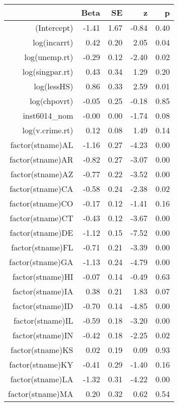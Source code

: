 \begin{table}[ht]
\centering
\begin{tabular}{rrrrr}
  \hline
 & Beta & SE & z & p \\ 
  \hline
(Intercept) & -1.41 & 1.67 & -0.84 & 0.40 \\ 
  log(incarrt) & 0.42 & 0.20 & 2.05 & 0.04 \\ 
  log(unemp.rt) & -0.29 & 0.12 & -2.40 & 0.02 \\ 
  log(singpar.rt) & 0.43 & 0.34 & 1.29 & 0.20 \\ 
  log(lessHS) & 0.86 & 0.33 & 2.59 & 0.01 \\ 
  log(chpovrt) & -0.05 & 0.25 & -0.18 & 0.85 \\ 
  inst6014\_nom & -0.00 & 0.00 & -1.74 & 0.08 \\ 
  log(v.crime.rt) & 0.12 & 0.08 & 1.49 & 0.14 \\ 
  factor(stname)AL & -1.16 & 0.27 & -4.23 & 0.00 \\ 
  factor(stname)AR & -0.82 & 0.27 & -3.07 & 0.00 \\ 
  factor(stname)AZ & -0.77 & 0.22 & -3.52 & 0.00 \\ 
  factor(stname)CA & -0.58 & 0.24 & -2.38 & 0.02 \\ 
  factor(stname)CO & -0.17 & 0.12 & -1.41 & 0.16 \\ 
  factor(stname)CT & -0.43 & 0.12 & -3.67 & 0.00 \\ 
  factor(stname)DE & -1.12 & 0.15 & -7.52 & 0.00 \\ 
  factor(stname)FL & -0.71 & 0.21 & -3.39 & 0.00 \\ 
  factor(stname)GA & -1.13 & 0.24 & -4.79 & 0.00 \\ 
  factor(stname)HI & -0.07 & 0.14 & -0.49 & 0.63 \\ 
  factor(stname)IA & 0.38 & 0.21 & 1.83 & 0.07 \\ 
  factor(stname)ID & -0.70 & 0.14 & -4.85 & 0.00 \\ 
  factor(stname)IL & -0.59 & 0.18 & -3.20 & 0.00 \\ 
  factor(stname)IN & -0.42 & 0.18 & -2.25 & 0.02 \\ 
  factor(stname)KS & 0.02 & 0.19 & 0.09 & 0.93 \\ 
  factor(stname)KY & -0.41 & 0.29 & -1.40 & 0.16 \\ 
  factor(stname)LA & -1.32 & 0.31 & -4.22 & 0.00 \\ 
  factor(stname)MA & 0.20 & 0.32 & 0.62 & 0.54 \\ 

\end{tabular}
\end{table}
